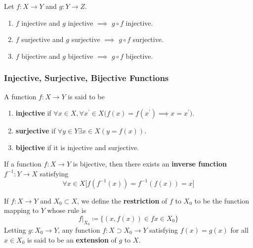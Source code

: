   \begin{theorem}[Composition]
    \label{thm:composition}
    Let $f: X \rightarrow Y$ and $g: Y \rightarrow Z$. 
    \begin{enumerate}
      \item $f$ injective and $g$ injective $\implies$ $g \circ f$ injective. 
      \item $f$ surjective and $g$ surjective $\implies$ $g \circ f$ surjective. 
      \item $f$ bijective and $g$ bijective $\implies$ $g \circ f$ bijective. 
    \end{enumerate}
  \end{theorem}

\subsubsection{Injective, Surjective, Bijective Functions}

  \begin{definition}
    \label{def:injectivity-surjectivity-bijectivity}
    A function $f: X \rightarrow Y$ is said to be 
    \begin{enumerate}
      \item \textbf{injective} if $\forall x \in X, \forall x^\prime \in X \big( f(x) = f(x^\prime) \implies x = x^\prime \big)$. 
      \item \textbf{surjective} if $\forall y \in Y \exists x \in X (y = f(x))$. 
      \item \textbf{bijective} if it is injective and surjective. 
    \end{enumerate}
  \end{definition}

  \begin{definition}
    \label{def:inverse-function}
    If a function $f: X \rightarrow Y$ is bijective, then there exists an \textbf{inverse function} $f^{-1}: Y \rightarrow X$ satisfying 
    \begin{equation}
      \forall x \in X \big[ f(f^{-1}(x)) = f^{-1} (f(x)) = x \big]
    \end{equation}
  \end{definition} 

  \begin{definition}
    \label{def:restriction-extension}
    If $f: X \rightarrow Y$ and $X_0 \subset X$, we define the \textbf{restriction} of $f$ to $X_0$ to be the function mapping to $Y$ whose rule is 
    \begin{equation}
      f|_{X_0} \coloneqq \{ (x, f(x)) \in f x \in X_0 \}
    \end{equation} 
    Letting $g: X_0 \rightarrow Y$, any function $f: X \supset X_0 \rightarrow Y$ satisfying $f(x) = g(x)$ for all $x \in X_0$ is said to be an \textbf{extension} of $g$ to $X$. 
  \end{definition} 

